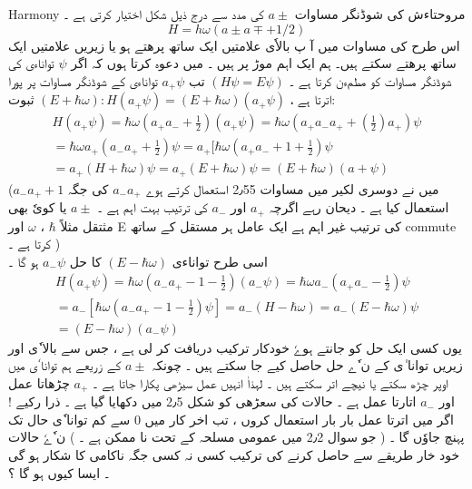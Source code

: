 
Harmony مروحتاءش کی شوڈنگر مساوات   
$ a \pm $
 کی مدد سے  درج ذیل شکل اختیار کرتی ہے ۔
\begin{equation}
 H=h \omega (a \pm a \mp + 1/2)  		
\end{equation}
اس  طرح کی مساوات میں آ پ بالاٗی علامتیں ایک ساتھ پرھتے ہو یا زیریں علامتیں ایک ساتھ پرھتے سکتے ہیں۔ ہم ایک اہم موڑ پر ہیں ۔ میں دعوہ کرتا ہوں کہ اگر  
$ \psi $
 تواناءی کی شوڈنگر مساوات کو مطمءن کرتا ہے ۔
$ ( H \psi = E \psi ) $
تب 
$a_+ \psi $
تواناءی کے شوڈنگر مساوات پر پورا اترتا ہے ،
$ ( E + \hbar \omega ) : H ( a_+ \psi ) = ( E + \hbar \omega) ( a_+ \psi ) $
ثبوت:
\begin{align}
H ( a_+ \psi ) = \hbar \omega ( a_+ a_- + \frac{1}{2}) (a_+ \psi) = \hbar \omega (a_+ a_- a_+ + ( \frac{1}{2} ) a_+) \psi
\\
  = \hbar \omega a_+ ( a_- a_+ + \frac{1}{2} ) \psi  = a_+[ \hbar \omega ( a_+ a_- + 1 + \frac{1}{2} ) \psi \\
  = a_+ ( H + \hbar \omega ) \psi = a_+ ( E + \hbar \omega ) \psi = ( E + \hbar \omega ) ( a + \psi )
\end{align}  
(میں نے دوسری لکیر میں مساوات 2٫55 استعمال کرتے ہوے 
$ a_- a_+ $
 کی جگہ 
$ a_- a_+ + 1$ 
 استعمال کیا ہے ۔ دیحان  رہے اگرچہ
$ a_+$
 اور
$  a_- $
 کی ترتیب بہت اہم ہے ۔ 
$ a \pm $
  یا کویٗ بھی مثتقل مثلاً 
$ \hbar $ 
 ، 
$ \omega$
اور E  کی ترتیب غیر اہم ہے ایک عامل ہر مستقل کے ساتھ commute کرتا ہے ۔ ) \\
 اسی طرح تواناءی 
$ ( E - \hbar \omega) $
کا حل
$ a_- \psi $
ہو گا ۔
\begin{align}
H(a_+ \psi ) = \hbar \omega ( a_- a_+  - 1 - \frac{1}{2}) (a_- \psi)    = \hbar \omega a_- ( a_+ a_-  - \frac{1}{2} ) \psi
 \\	           = a_- [ \hbar \omega ( a_- a_+  - 1 - \frac{1}{2} ) \psi ] = a_- ( H - \hbar \omega ) = a_- ( E - \hbar \omega ) \psi 
	\\	=( E - \hbar \omega ) ( a_- \psi )
\end{align}
یوں کسی ایک حل کو جانتے ہوےٗ خودکار ترکیب دریافت کر لی ہے ، جس سے بالا ٗی اور زیریں توانا ٰی کے ن ٗے حل حاصل کیے جا سکتے ہیں ۔ چونکہ 
$ a \pm $
کے زریعے ہم توانا ٗی میں اوپر چڑھ سکتے یا نیچے اتر سکتے ہیں ۔ لہذاٰ انہیں عمل سیڑھی پکارا جاتا ہے ۔
$ a_+ $
چڑھاتا عمل اور 
$ a_- $ 
اتارتا عمل ہے ۔ حالات کی سعڑھی کو شکل 2٫5 میں دکھایا گیا ہے ۔
ذرا رکیے ! اگر میں اترتا عمل بار بار استعمال کروں ، تب اخر کار میں 0 سے کم توانا ٗی حال تک پہنچ جاوٗں گا ۔ ( جو سوال 2٫2 میں عمومی مسلحہ کے تحت  نا ممکن ہے ۔ ) ن ٗےٗ حالات خود خار طریقے سے حاصل کرنے کی ترکیب  کسی نہ کسی جگہ  ناکامی کا شکار ہو گی ۔  ایسا کیوں ہو گا ؟
